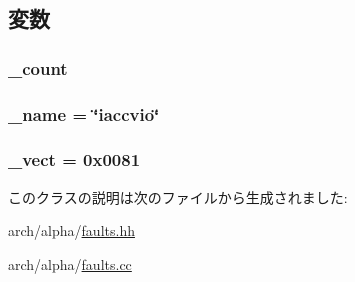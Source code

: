 \subsection{変数}
\hypertarget{classAlphaISA_1_1ItbAcvFault_a4bff925c412f331c5aaf6a39b79619ff}{
\subsubsection[{\_\-count}]{ {\bf \_\-count}}}
\label{classAlphaISA_1_1ItbAcvFault_a4bff925c412f331c5aaf6a39b79619ff}
\hypertarget{classAlphaISA_1_1ItbAcvFault_ac79073ffcd2c66a09bcd3bd3ad206019}{
\subsubsection[{\_\-name}]{ {\bf \_\-name} = \char`\"{}iaccvio\char`\"{}}}
\label{classAlphaISA_1_1ItbAcvFault_ac79073ffcd2c66a09bcd3bd3ad206019}
\hypertarget{classAlphaISA_1_1ItbAcvFault_ad9e5855b9db0b2824cf6c507be4a872e}{
\subsubsection[{\_\-vect}]{ {\bf \_\-vect} = 0x0081}}
\label{classAlphaISA_1_1ItbAcvFault_ad9e5855b9db0b2824cf6c507be4a872e}


このクラスの説明は次のファイルから生成されました:\begin{DoxyCompactItemize}
\item 
arch/alpha/\hyperlink{arch_2alpha_2faults_8hh}{faults.hh}\item 
arch/alpha/\hyperlink{arch_2alpha_2faults_8cc}{faults.cc}\end{DoxyCompactItemize}
